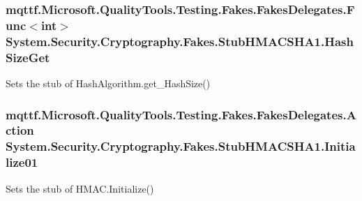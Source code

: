 \hypertarget{class_system_1_1_security_1_1_cryptography_1_1_fakes_1_1_stub_h_m_a_c_s_h_a1_a00309325a78aa7bba7ca48b19c4dd0f4}{
\subsubsection[{Hash\-Size\-Get}]{\setlength{\rightskip}{0pt plus 5cm}mqttf.\-Microsoft.\-Quality\-Tools.\-Testing.\-Fakes.\-Fakes\-Delegates.\-Func$<$int$>$ System.\-Security.\-Cryptography.\-Fakes.\-Stub\-H\-M\-A\-C\-S\-H\-A1.\-Hash\-Size\-Get}}\label{class_system_1_1_security_1_1_cryptography_1_1_fakes_1_1_stub_h_m_a_c_s_h_a1_a00309325a78aa7bba7ca48b19c4dd0f4}


Sets the stub of Hash\-Algorithm.\-get\-\_\-\-Hash\-Size()

\hypertarget{class_system_1_1_security_1_1_cryptography_1_1_fakes_1_1_stub_h_m_a_c_s_h_a1_ae72f7b258c3fd4566cf745206b73311d}{
\subsubsection[{Initialize01}]{\setlength{\rightskip}{0pt plus 5cm}mqttf.\-Microsoft.\-Quality\-Tools.\-Testing.\-Fakes.\-Fakes\-Delegates.\-Action System.\-Security.\-Cryptography.\-Fakes.\-Stub\-H\-M\-A\-C\-S\-H\-A1.\-Initialize01}}\label{class_system_1_1_security_1_1_cryptography_1_1_fakes_1_1_stub_h_m_a_c_s_h_a1_ae72f7b258c3fd4566cf745206b73311d}


Sets the stub of H\-M\-A\-C.\-Initialize()

